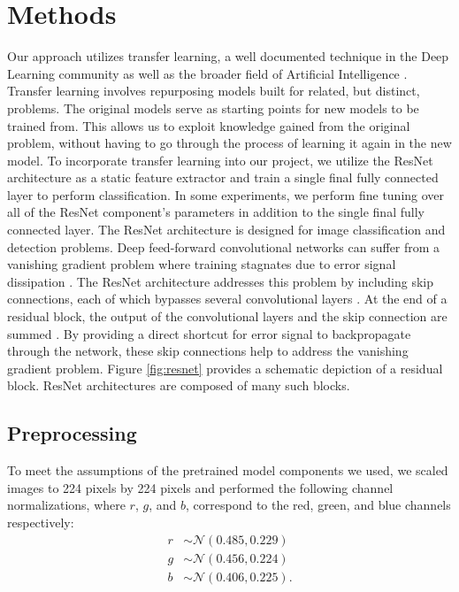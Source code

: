 \section{Methods}


Our approach utilizes transfer learning, a well documented technique in the Deep Learning community as well as the broader field of Artificial Intelligence \cite{pan2010survey}.
Transfer learning involves repurposing models built for related, but distinct, problems. The original models serve as starting points for new models to be trained from.
This allows us to exploit knowledge gained from the original problem, without having to go through the process of learning it again in the new model. 
To incorporate transfer learning into our project, we utilize the ResNet \cite{he2016deep} architecture as a static feature extractor and train a single final fully connected layer to perform classification.
In some experiments, we perform fine tuning over all of the ResNet component's parameters in addition to the single final fully connected layer.
The ResNet architecture is designed for image classification and detection problems.
Deep feed-forward convolutional networks can suffer from a vanishing gradient problem where training stagnates due to error signal dissipation \cite{gross2016training}.
The ResNet architecture addresses this problem by including skip connections, each of which bypasses several convolutional layers \cite{he2016deep}.
At the end of a residual block, the output of the convolutional layers and the skip connection are summed \cite{gross2016training}.
By providing a direct shortcut for error signal to backpropagate through the network, these skip connections help to address the vanishing gradient problem.
Figure \ref{fig:resnet} provides a schematic depiction of a residual block.
ResNet architectures are composed of many such blocks.

\subsection{Preprocessing}

To meet the assumptions of the pretrained model components we used, we scaled images to 224 pixels by 224 pixels and performed the following channel normalizations, where $r$, $g$, and $b$, correspond to the red, green, and blue channels respectively:
\begin{align*}
r
&\sim
\mathcal{N}(0.485, 0.229) \\
g
&\sim 
\mathcal{N}(0.456, 0.224) \\
b
&\sim
\mathcal{N}(0.406, 0.225).
\end{align*}

